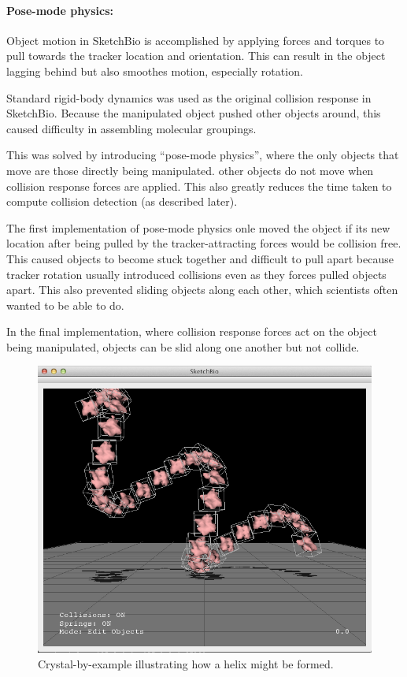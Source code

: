 \documentclass[twocolumn]{bmcart}%
\begin{document}
\paragraph*{Pose-mode physics:}
Object motion in SketchBio is accomplished by applying forces and torques to pull towards the tracker location and orientation.
This can result in the object lagging behind but also smoothes motion, especially rotation.

Standard rigid-body dynamics was used as the original collision response in SketchBio. Because the manipulated object pushed other objects around, this caused difficulty in assembling molecular groupings.

This was solved by introducing ``pose-mode physics'', where the only objects that move are those directly being manipulated.
other objects do not move when collision response forces are applied.
This also greatly reduces the time taken to compute collision detection (as described later).

The first implementation of pose-mode physics onle moved the object if its new location after being pulled by the tracker-attracting forces would be collision free.
This caused objects to become stuck together and difficult to pull apart because tracker rotation usually introduced collisions even as they forces pulled objects apart.
This also prevented sliding objects along each other, which scientists often wanted to be able to do.

In the final implementation, where collision response forces act on the object being manipulated, objects can be slid along one another but not collide.

\begin{figure}[h]
\centering
\includegraphics[width=0.9\columnwidth]{crystalByExample.png}
\caption{Crystal-by-example illustrating how a helix might be formed.}
\label{fig:crystal_by_example}
\end{figure}
\end{document}
